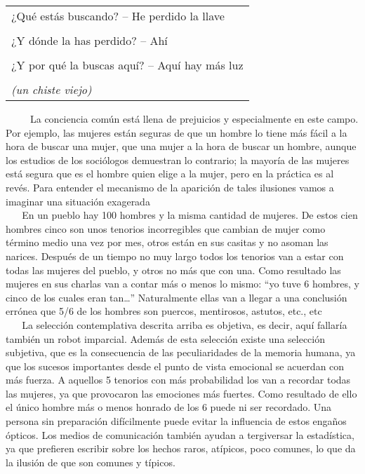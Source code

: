 \begin{longtable}[]{@{}l@{}}
\toprule
¿Qué estás buscando? -- He perdido la llave\tabularnewline
\tabularnewline
¿Y dónde la has perdido? -- Ahí\tabularnewline
\tabularnewline
¿Y por qué la buscas aquí? -- Aquí hay más luz\tabularnewline
\tabularnewline
\emph{(un chiste viejo)}\tabularnewline
\bottomrule
\end{longtable}

~ ~ ~ La conciencia común está llena de prejuicios y especialmente en
este campo. Por ejemplo, las mujeres están seguras de que un hombre lo
tiene más fácil a la hora de buscar una mujer, que una mujer a la hora
de buscar un hombre, aunque los estudios de los sociólogos demuestran lo
contrario; la mayoría de las mujeres está segura que es el hombre quien
elige a la mujer, pero en la práctica es al revés. Para entender el
mecanismo de la aparición de tales ilusiones vamos a imaginar una
situación exagerada\\
\hspace*{0.333em} ~ ~ En un pueblo hay 100 hombres y la misma cantidad
de mujeres. De estos cien hombres cinco son unos tenorios incorregibles
que cambian de mujer como término medio una vez por mes, otros están en
sus casitas y no asoman las narices. Después de un tiempo no muy largo
todos los tenorios van a estar con todas las mujeres del pueblo, y otros
no más que con una. Como resultado las mujeres en sus charlas van a
contar más o menos lo mismo: ``yo tuve 6 hombres, y cinco de los cuales
eran tan\ldots{}'' Naturalmente ellas van a llegar a una conclusión
errónea que 5/6 de los hombres son puercos, mentirosos, astutos, etc.,
etc\\
\hspace*{0.333em} ~ ~ La selección contemplativa descrita arriba es
objetiva, es decir, aquí fallaría también un robot imparcial. Además de
esta selección existe una selección subjetiva, que es la consecuencia de
las peculiaridades de la memoria humana, ya que los sucesos importantes
desde el punto de vista emocional se acuerdan con más fuerza. A aquellos
5 tenorios con más probabilidad los van a recordar todas las mujeres, ya
que provocaron las emociones más fuertes. Como resultado de ello el
único hombre más o menos honrado de los 6 puede ni ser recordado. Una
persona sin preparación difícilmente puede evitar la influencia de estos
engaños ópticos. Los medios de comunicación también ayudan a tergiversar
la estadística, ya que prefieren escribir sobre los hechos raros,
atípicos, poco comunes, lo que da la ilusión de que son comunes y
típicos.

